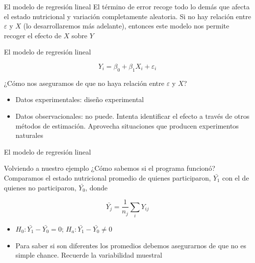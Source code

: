 \documentclass{beamer}
\begin{document}
\begin{frame}{El modelo de regresión lineal}
    El término de error recoge todo lo demás que afecta el estado nutricional y variación completamente aleatoria. Si no hay relación entre $\varepsilon$ y $X$ (lo desarrollaremos más adelante), entonces este modelo nos permite recoger el efecto de $X$ sobre $Y$
\end{frame}

\begin{frame}{El modelo de regresión lineal}

\begin{equation*}
    Y_{i}=\beta_0+\beta_1X_i+\varepsilon_i
\end{equation*}

¿Cómo nos aseguramos de que no haya relación entre $\varepsilon$ y $X$?

\begin{itemize}
    \item Datos experimentales: diseño experimental
    \item Datos observacionales: no puede. Intenta identificar el efecto a través de otros métodos de estimación. Aprovecha situaciones que producen experimentos naturales
\end{itemize}
    
\end{frame}


\begin{frame}{El modelo de regresión lineal}

Volviendo a nuestro ejemplo ¿Cómo sabemos si el programa funcionó? Comparamos el estado nutricional promedio de quienes participaron, $\bar{Y_1}$ con el de quienes no participaron, $\bar{Y_0}$, donde

\begin{equation*}
    \bar{Y_j}=\dfrac{1}{n_j}\sum_iY_{ij}
\end{equation*}
 \begin{itemize}
     \item $H_0:\bar{Y_1}-\bar{Y_0}=0$; $H_a:\bar{Y_1}-\bar{Y_0}\neq 0$
     \item Para saber si son diferentes los promedios debemos asegurarnos de que no es simple chance. Recuerde la variabilidad muestral
 \end{itemize}
     
\end{frame}
\end{document}
